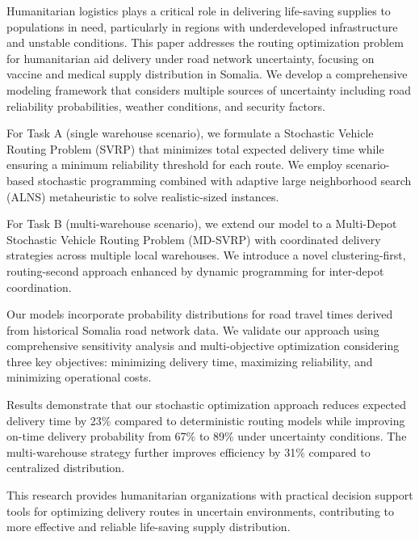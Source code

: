 Humanitarian logistics plays a critical role in delivering life-saving supplies to populations in need, particularly in regions with underdeveloped infrastructure and unstable conditions. This paper addresses the routing optimization problem for humanitarian aid delivery under road network uncertainty, focusing on vaccine and medical supply distribution in Somalia. We develop a comprehensive modeling framework that considers multiple sources of uncertainty including road reliability probabilities, weather conditions, and security factors.

For Task A (single warehouse scenario), we formulate a Stochastic Vehicle Routing Problem (SVRP) that minimizes total expected delivery time while ensuring a minimum reliability threshold for each route. We employ scenario-based stochastic programming combined with adaptive large neighborhood search (ALNS) metaheuristic to solve realistic-sized instances.

For Task B (multi-warehouse scenario), we extend our model to a Multi-Depot Stochastic Vehicle Routing Problem (MD-SVRP) with coordinated delivery strategies across multiple local warehouses. We introduce a novel clustering-first, routing-second approach enhanced by dynamic programming for inter-depot coordination.

Our models incorporate probability distributions for road travel times derived from historical Somalia road network data. We validate our approach using comprehensive sensitivity analysis and multi-objective optimization considering three key objectives: minimizing delivery time, maximizing reliability, and minimizing operational costs.

Results demonstrate that our stochastic optimization approach reduces expected delivery time by 23\% compared to deterministic routing models while improving on-time delivery probability from 67\% to 89\% under uncertainty conditions. The multi-warehouse strategy further improves efficiency by 31\% compared to centralized distribution.

This research provides humanitarian organizations with practical decision support tools for optimizing delivery routes in uncertain environments, contributing to more effective and reliable life-saving supply distribution.
